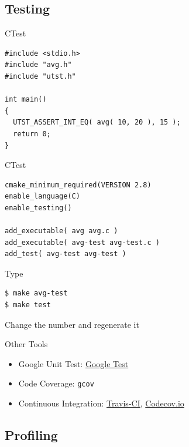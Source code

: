\documentclass{../TexTemplate/myslide}
\begin{document}
\subsection{Testing}
\begin{frame}
\subsectionpage
\end{frame}

\begin{frame}[fragile]{CTest}
\begin{lstlisting}
#include <stdio.h>
#include "avg.h"
#include "utst.h"

int main()
{
  UTST_ASSERT_INT_EQ( avg( 10, 20 ), 15 );
  return 0;
}
\end{lstlisting}
\end{frame}

\begin{frame}[fragile]{CTest}
\begin{verbatim}
cmake_minimum_required(VERSION 2.8)
enable_language(C)
enable_testing()

add_executable( avg avg.c )
add_executable( avg-test avg-test.c )
add_test( avg-test avg-test )
\end{verbatim}
Type
\begin{verbatim}
$ make avg-test
$ make test
\end{verbatim}
Change the number and regenerate it
\end{frame}

\begin{frame}[fragile]{Other Tools}
\begin{itemize}
	\item Google Unit Test: \href{https://github.com/google/googletest}{Google Test}
	\item Code Coverage: \verb'gcov'
	\item Continuous Integration: \href{https://travis-ci.org/profile}{Travis-CI}, \href{https://codecov.io/}{Codecov.io}
\end{itemize}
\end{frame}

\subsection{Profiling}
\begin{frame}
\subsectionpage
\end{frame}
\end{document}
